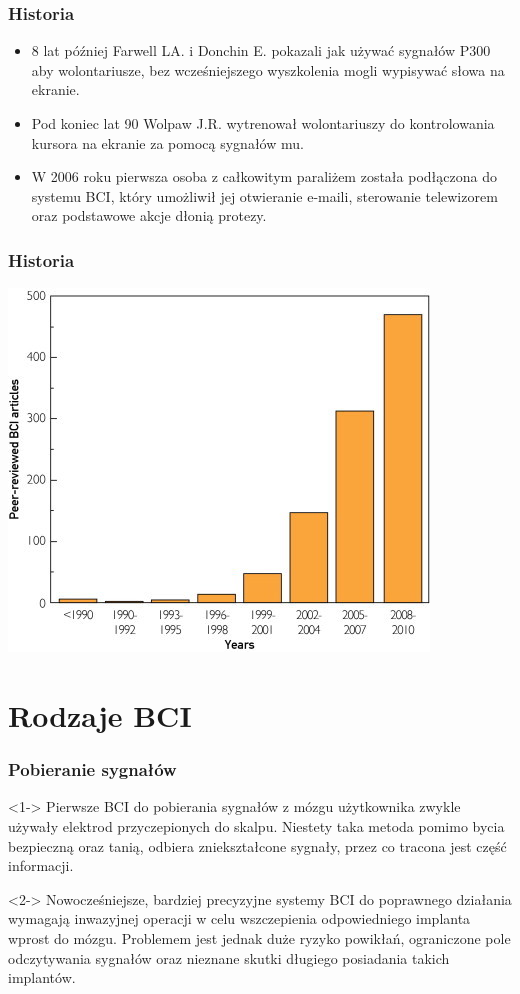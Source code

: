 \documentclass{beamer}
\begin{document}
\begin{frame}
    \frametitle{Historia}
    \begin{itemize}
        \item <1-> 8 lat później Farwell LA. i Donchin E. pokazali jak używać sygnałów P300 aby wolontariusze, bez wcześniejszego wyszkolenia mogli wypisywać słowa na ekranie.
        \item <2-> Pod koniec lat 90 Wolpaw J.R. wytrenował wolontariuszy do kontrolowania kursora na ekranie za pomocą sygnałów mu.
        \item <3-> W 2006 roku pierwsza osoba z całkowitym paraliżem została podłączona do systemu BCI, który umożliwił jej otwieranie e-maili, sterowanie telewizorem oraz podstawowe akcje dłonią protezy.         
    \end{itemize}
\end{frame}
\begin{frame}
\frametitle{Historia}
\begin{center}
    \includegraphics[scale=0.8]{chart.jpg}
\end{center}    
\end{frame}

\section{Rodzaje BCI}

\begin{frame}
    \frametitle{Pobieranie sygnałów}
        \begin{block}{}<1->
            Pierwsze BCI do pobierania sygnałów z mózgu użytkownika zwykle używały elektrod przyczepionych do skalpu.
            Niestety taka metoda pomimo bycia bezpieczną oraz tanią, odbiera zniekształcone sygnały, przez co tracona jest część informacji.
        \end{block}
        \begin{block}{}<2->
                Nowocześniejsze, bardziej precyzyjne systemy BCI do poprawnego działania wymagają inwazyjnej operacji w celu
                wszczepienia odpowiedniego implanta wprost do mózgu. Problemem jest jednak duże ryzyko powikłań, ograniczone
                pole odczytywania sygnałów oraz nieznane skutki długiego posiadania takich implantów.
        \end{block}
\end{frame}
\end{document}
